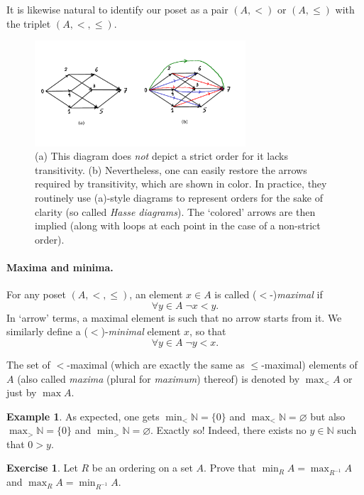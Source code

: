 \documentclass[12pt,notitlepage]{article}
\theoremstyle{plain}
\theoremstyle{definition}
\newtheorem{exc}[thm]{Exercise}
\newtheorem{exm}[thm]{Example}
\theoremstyle{plain}
\newcommand{\N}{\mathbb{N}}
\newcommand{\void}{\varnothing}
\newcommand{\1}{\mathbf{1}}
\newcommand{\0}{\mathbf{0}}
\begin{document}
It is likewise natural to identify our poset as a pair $(A, <)$ or $(A, \leq)$ with the triplet $(A, <, \leq)$.

\begin{figure}[h]
\centering
\includegraphics*[width=0.7\textwidth]{hasse.pdf}
\caption{\label{fig:cube_3}(a) This diagram does \emph{not} depict a strict order for it lacks transitivity. (b) Nevertheless, one can easily restore the arrows required by transitivity, which are shown in color. In practice, they routinely use (a)-style diagrams to represent orders for the sake of clarity (so called \emph{Hasse diagrams}). The `colored' arrows are then implied (along with loops at each point in the case of a non-strict order).}
\end{figure}

\paragraph{Maxima and minima.} For any poset $(A, {<}, {\leq})$, an element $x \in A$ is called ($<$-)\emph{maximal} if
$$\forall y \in A\; \neg x < y.$$
In `arrow' terms, a maximal element is such that no arrow starts from it. We similarly define a (${<}$)-\emph{minimal} element $x$, so that
$$\forall y \in A\; \neg y < x.$$

The set of  ${<}$-maximal (which are exactly the same as ${\leq}$-maximal) elements of $A$ (also called \emph{maxima} (plural for \emph{maximum}) thereof) is denoted by $\max_{<} A$ or just by $\max A$.

\begin{exm}
As expected, one gets $\min_{<} \N = \{0\}$ and $\max_{<} \N = \void$ but also $\max_{>} \N = \{0\}$ and $\min_{>} \N = \void$. Exactly so! Indeed, there exists no $y \in \N$ such that $0 > y$.
\end{exm}

\begin{exc}
Let $R$ be an ordering on a set $A$. Prove that $\min_{R} A = \max_{R^{-1}} A$ and $\max_{R} A = \min_{R^{-1}} A$.
\end{exc}
\end{document}
